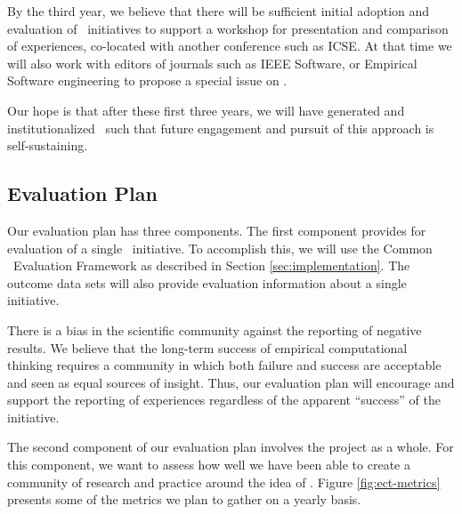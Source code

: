 By the third year, we believe that there will be sufficient
initial adoption and evaluation of \eCT\ initiatives to support a workshop
for presentation and comparison of experiences, co-located with another
conference such as ICSE.  At that time we will also work with editors of
journals such as IEEE Software, or Empirical Software engineering to
propose a special issue on \eCT.

Our hope is that after these first three years, we will have generated and 
institutionalized \eCT\ such that future engagement and pursuit of this 
approach is self-sustaining. 

\subsection{Evaluation Plan}



Our evaluation plan has three components.  The first component provides for
evaluation of a single \eCT\ initiative.  To accomplish this, we will use
the Common \eCT\ Evaluation Framework as described in Section
\ref{sec:implementation}.  The outcome data sets will also provide
evaluation information about a single initiative.

There is a bias in the scientific community against the reporting of
negative results.  We believe that the long-term success of empirical
computational thinking requires a community in which both failure and
success are acceptable and seen as equal sources of insight. Thus, our
evaluation plan will encourage and support the reporting of experiences
regardless of the apparent ``success'' of the initiative.

The second component of our evaluation plan involves the project as a
whole.  For this component, we want to assess how well we have been able
to create a community of research and practice around
the idea of \eCT.  Figure \ref{fig:ect-metrics} presents some of the
metrics we plan to gather on a yearly basis.

